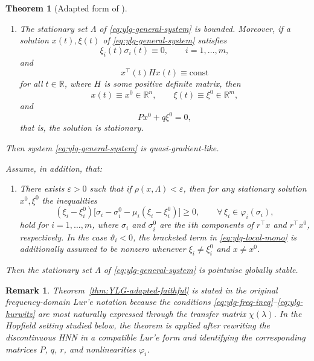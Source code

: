 \documentclass[journal]{IEEEtran}
\newtheorem{theorem}{Theorem}
\newtheorem{remark}{Remark}
\begin{document}
\begin{theorem}[Adapted form of {\cite[Theorem~3.1]{YLG}}]
\begin{enumerate}
\item[(v)]
The stationary set \(\Lambda\) of \eqref{eq:ylg-general-system} is bounded.
Moreover, if a solution \(x(t),\xi(t)\) of \eqref{eq:ylg-general-system}
satisfies
\begin{equation}
  \xi_i(t)\sigma_i(t)\equiv 0,
  \qquad i=1,\dots,m,
  \label{eq:ylg-orthogonality}
\end{equation}
and
\begin{equation}
  x^{\top}(t) H x(t)\equiv \mathrm{const}
  \label{eq:ylg-quadratic-const}
\end{equation}
for all \(t\in\mathbb{R}\), where \(H\) is some positive definite matrix,
then
\[
  x(t)\equiv x^0\in\mathbb{R}^n,\qquad
  \xi(t)\equiv \xi^0\in\mathbb{R}^m,
\]
and
\[
  Px^0 + q\xi^0 = 0,
\]
that is, the solution is stationary.
\end{enumerate}

Then system \eqref{eq:ylg-general-system} is quasi-gradient-like.

Assume, in addition, that:

\begin{enumerate}
\item[(vi)]
There exists \(\varepsilon>0\) such that if \(\rho(x,\Lambda)<\varepsilon\),
then for any stationary solution \(x^0,\xi^0\) the inequalities
\begin{equation}
  (\xi_i-\xi_i^0)
  \bigl[\sigma_i-\sigma_i^0-\mu_i(\xi_i-\xi_i^0)\bigr]\ge 0,
  \qquad
  \forall\,\xi_i\in\varphi_i(\sigma_i),
  \label{eq:ylg-local-mono}
\end{equation}
hold for \(i=1,\dots,m\), where \(\sigma_i\) and \(\sigma_i^0\) are the
\(i\)th components of \(r^{\top}x\) and \(r^{\top}x^0\), respectively.
In the case \(\vartheta_i<0\), the bracketed term in
\eqref{eq:ylg-local-mono} is additionally assumed to be nonzero whenever
\(\xi_i\neq \xi_i^0\) and \(x\neq x^0\).
\end{enumerate}

Then the stationary set \(\Lambda\) of
\eqref{eq:ylg-general-system} is pointwise globally stable.
\end{theorem}

\begin{remark}
Theorem~\ref{thm:YLG-adapted-faithful} is stated in the original
frequency-domain Lur'e notation because the conditions
\eqref{eq:ylg-freq-ineq}--\eqref{eq:ylg-hurwitz} are most naturally expressed
through the transfer matrix \(\chi(\lambda)\). In the Hopfield setting studied
below, the theorem is applied after rewriting the discontinuous HNN in a
compatible Lur'e form and identifying the corresponding matrices
\(P\), \(q\), \(r\), and nonlinearities \(\varphi_i\).
\end{remark}
\end{document}
